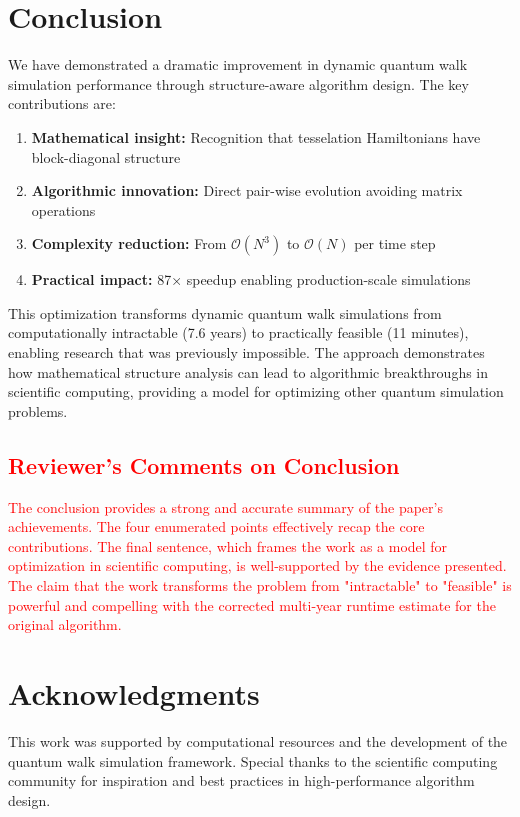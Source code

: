 \documentclass[11pt,a4paper]{article}
\newcommand{\bigO}{\mathcal{O}}
\begin{document}
\section{Conclusion}

We have demonstrated a dramatic improvement in dynamic quantum walk simulation performance through structure-aware algorithm design. The key contributions are:

\begin{enumerate}
\item \textbf{Mathematical insight:} Recognition that tesselation Hamiltonians have block-diagonal structure
\item \textbf{Algorithmic innovation:} Direct pair-wise evolution avoiding matrix operations
\item \textbf{Complexity reduction:} From $\bigO(N^3)$ to $\bigO(N)$ per time step
\item \textbf{Practical impact:} 87× speedup enabling production-scale simulations
\end{enumerate}

This optimization transforms dynamic quantum walk simulations from computationally intractable (7.6 years) to practically feasible (11 minutes), enabling research that was previously impossible. The approach demonstrates how mathematical structure analysis can lead to algorithmic breakthroughs in scientific computing, providing a model for optimizing other quantum simulation problems.

\textcolor{red}{
\subsection*{Reviewer's Comments on Conclusion}
The conclusion provides a strong and accurate summary of the paper's achievements. The four enumerated points effectively recap the core contributions. The final sentence, which frames the work as a model for optimization in scientific computing, is well-supported by the evidence presented. The claim that the work transforms the problem from "intractable" to "feasible" is powerful and compelling with the corrected multi-year runtime estimate for the original algorithm.
}

\section*{Acknowledgments}

This work was supported by computational resources and the development of the quantum walk simulation framework. Special thanks to the scientific computing community for inspiration and best practices in high-performance algorithm design.
\end{document}
